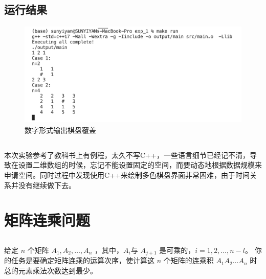 \newpage

\subsection*{}
\begin{code}
    
\end{code}

\subsection*{运行结果}

\begin{figure}[htbp]
    \centering
    \includegraphics[height=5cm]{figure/run_time_1.png}
    \caption*{数字形式输出棋盘覆盖}
  \end{figure} 

\subsection*{}
本次实验参考了教科书上有例程，太久不写C++，一些语言细节已经记不清，导致在设置二维数组的时候，忘记不能设置固定的空间，而要动态地根据数据规模来申请空间。同时过程中发现使用C++来绘制多色棋盘界面非常困难，由于时间关系并没有继续做下去。
\newpage



\section{矩阵连乘问题}

\subsection*{}
给定 $n$ 个矩阵 $A_1,A_2,…,A_n$ ，其中，$A_i$与 $A_{j+1}$ 是可乘的，$i=1,2,…,n-l$。
你的任务是要确定矩阵连乘的运算次序，使计算这 $n$ 个矩阵的连乘积 $A_{1}A_{2}…A_{n}$ 时总的元素乘法次数达到最少。

